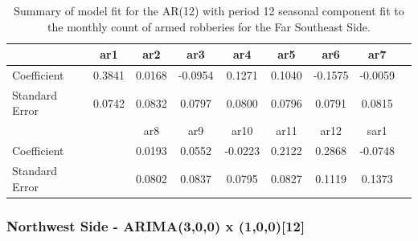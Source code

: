 \documentclass{article} %
\begin{document}

   \begin{table}[h]
	\label{tab:data}
	\begin{center}
	\begin{tabular}{lcccccccc}
			\hline
      &   ar1  &   ar2    &  ar3  &   ar4 &    ar5   &  ar6  &    ar7    \\\hline
 Coefficient &       0.3841 & 0.0168&  -0.0954 & 0.1271 & 0.1040 & -0.1575  & -0.0059 \\
 Standard Error & 0.0742 &  0.0832 &  0.0797  &0.0800 & 0.0796 &  0.0791 &  0.0815 \\\hline
& & ar8 &  ar9  &   ar10  &  ar11  &   ar12   & sar1 \\\hline
Coefficient &  & 0.0193 & 0.0552 & -0.0223&  0.2122 &  0.2868  &-0.0748\\
Standard Error &  & 0.0802 & 0.0837  & 0.0795 & 0.0827 & 0.1119 &  0.1373\\
		\end{tabular}
	\caption{Summary of model fit for the AR(12) with period 12 seasonal component fit to the monthly count of armed robberies for the Far Southeast Side.}
	\end{center}
\end{table}





 \break
 \newpage
 
\subsubsection{Northwest Side - ARIMA(3,0,0) x (1,0,0)[12]}
 
\end{document}
